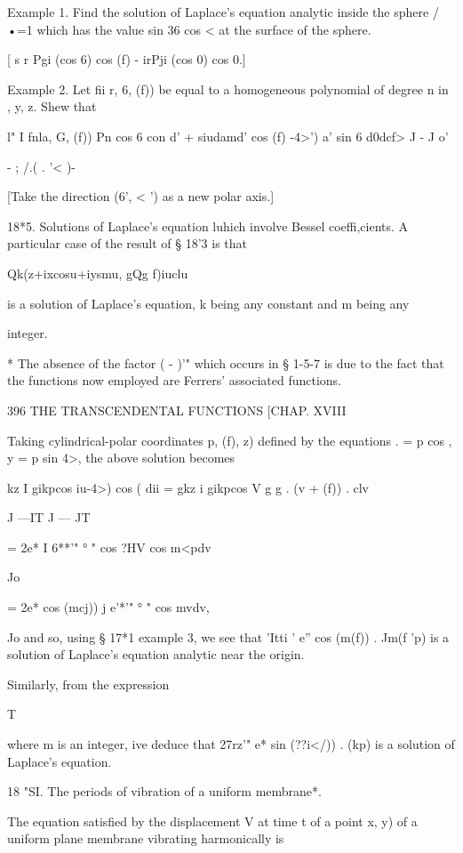 Example 1. Find the solution of Laplace's equation analytic inside the
sphere /•=1 which has the value sin 36 cos < at the surface of the
sphere.

[ s r Pgi (cos 6) cos (f) - irPji (cos 0) cos 0.]

Example 2. Let fii r, 6, (f)) be equal to a homogeneous polynomial of
degree n in , y, z. Shew that

l" I fnla, G, (f)) Pn cos 6 con d' + siudamd' cos (f) -4>') a' sin 6
d0dcf> J - J o'

- ; /.( . '< )-

[Take the direction (6', < ') as a new polar axis.]

18*5. Solutions of Laplace's equation luhich involve Bessel
coeffi,cients. A particular case of the result of § 18'3 is that



Qk(z+ixcosu+iysmu, gQg f)iuclu

is a solution of Laplace's equation, k being any constant and m being
any

integer.

* The absence of the factor ( - )'" which occurs in § 1-5-7 is due to
the fact that the functions now employed are Ferrers' associated
functions.



396 THE TRANSCENDENTAL FUNCTIONS [CHAP. XVIII

Taking cylindrical-polar coordinates p, (f), z) defined by the
equations . = p cos , y = p sin 4>, the above solution becomes

 kz I gikpcos iu-4>) cos ( dii = gkz i gikpcos V g g . (v + (f)) . clv

J —IT J — JT

= 2e* I 6**'" ° " cos ?HV cos m<pdv

Jo

= 2e* cos (mcj)) j e'*'" ° " cos mvdv,

Jo and so, using § 17*1 example 3, we see that 'Itti ' e'' cos (m(f))
. Jm(f 'p) is a solution of Laplace's equation analytic near the
origin.

Similarly, from the expression

T

where m is an integer, ive deduce that 27rz'" e* sin (??i</)) . (kp)
is a solution of Laplace's equation.

18 "SI. The periods of vibration of a uniform membrane*.

The equation satisfied by the displacement V at time t of a point x,
y) of a uniform plane membrane vibrating harmonically is

